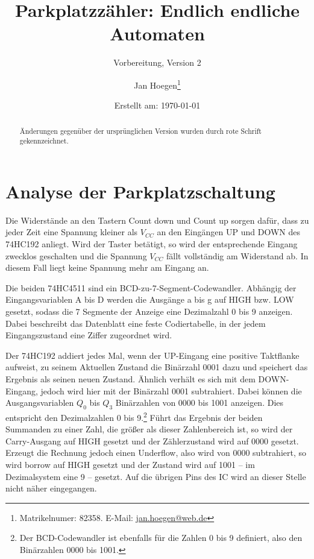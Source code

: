 \documentclass[
    paper=a4,
]{scrartcl}
\title{Parkplatzzähler: Endlich endliche Automaten}
\subtitle{Vorbereitung, Version 2}
\author{Jan Hoegen\thanks{Matrikelnumer: 82358. E-Mail: \href{mailto:jan.hoegen@web.de}{jan.hoegen@web.de}}}
\date{Erstellt am: \today}
\newcommand{\edit}[1]{\textcolor{colorred}{#1}}
\begin{document}
\maketitle

\begin{abstract}
    \noindent
    Änderungen gegenüber der ursprünglichen Version wurden durch \edit{rote Schrift} gekennzeichnet.
\end{abstract}

\tableofcontents

\newpage

\section{Analyse der Parkplatzschaltung}
    Die Widerstände an den Tastern Count down und Count up sorgen dafür, dass zu jeder Zeit eine Spannung kleiner als \(V_{CC}\) an den Eingängen UP und DOWN des 74HC192 anliegt. Wird der Taster betätigt, so wird der entsprechende Eingang zwecklos geschalten und die Spannung \(V_{CC}\) fällt vollständig am Widerstand ab. In diesem Fall liegt keine Spannung mehr am Eingang an.

    Die beiden 74HC4511 sind ein BCD-zu-7-Segment-Codewandler. Abhängig der Eingangsvariablen A bis D werden die Ausgänge a bis g auf HIGH bzw. LOW gesetzt, sodass die 7 Segmente der Anzeige eine Dezimalzahl 0 bis 9 anzeigen. Dabei beschreibt das Datenblatt eine feste Codiertabelle, in der jedem Eingangszustand eine Ziffer zugeordnet wird.

    Der 74HC192 addiert jedes Mal, wenn der UP-Eingang eine positive Taktflanke aufweist, zu seinem Aktuellen Zustand die Binärzahl 0001 dazu und speichert das Ergebnis als seinen neuen Zustand. Ähnlich verhält es sich mit dem DOWN-Eingang, jedoch wird hier mit der Binärzahl 0001 subtrahiert. Dabei können die Ausgangsvariablen \(Q_0\) bis \(Q_3\) Binärzahlen von 0000 bis 1001 anzeigen. Dies entspricht den Dezimalzahlen 0 bis 9.\footnote{Der BCD-Codewandler ist ebenfalls für die Zahlen 0 bis 9 definiert, also den Binärzahlen 0000 bis 1001.} Führt das Ergebnis der beiden Summanden zu einer Zahl, die größer als dieser Zahlenbereich ist, so wird der Carry-Ausgang auf HIGH gesetzt und \edit{der Zählerzustand wird auf 0000 gesetzt}. Erzeugt die Rechnung jedoch einen Underflow\edit{, also wird von 0000 subtrahiert}, so wird borrow auf HIGH gesetzt \edit{und der Zustand wird auf 1001 -- im Dezimalsystem eine 9 -- gesetzt}.
% 
    Auf die übrigen Pins des IC wird an dieser Stelle nicht näher eingegangen.
\end{document}
